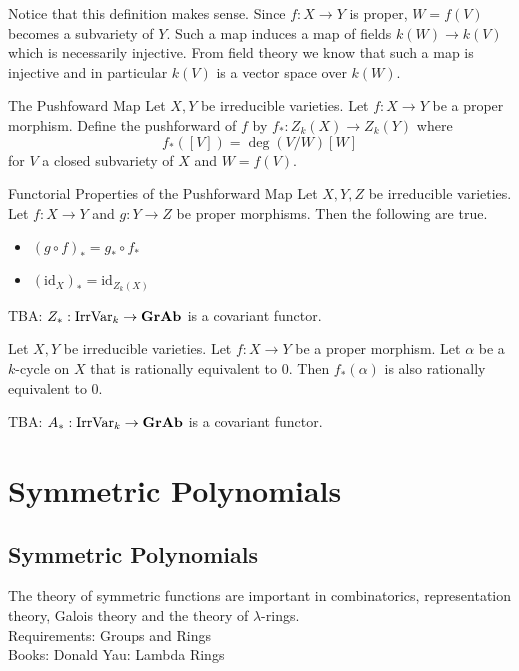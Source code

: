 \documentclass[a4paper]{article}
\begin{document}
Notice that this definition makes sense. Since $f:X\to Y$ is proper, $W=f(V)$ becomes a subvariety of $Y$. Such a map induces a map of fields $k(W)\to k(V)$ which is necessarily injective. From field theory we know that such a map is injective and in particular $k(V)$ is a vector space over $k(W)$. 

\begin{defn}{The Pushfoward Map}{} Let $X,Y$ be irreducible varieties. Let $f:X\to Y$ be a proper morphism. Define the pushforward of $f$ by $f_\ast:Z_k(X)\to Z_k(Y)$ where $$f_\ast([V])=\deg(V/W)[W]$$ for $V$ a closed subvariety of $X$ and $W=f(V)$. 
\end{defn}

\begin{lmm}{Functorial Properties of the Pushforward Map}{} Let $X,Y,Z$ be irreducible varieties. Let $f:X\to Y$ and $g:Y\to Z$ be proper morphisms. Then the following are true. 
\begin{itemize}
\item $(g\circ f)_\ast=g_\ast\circ f_\ast$
\item $(\text{id}_X)_\ast=\text{id}_{Z_k(X)}$
\end{itemize}
\end{lmm}

TBA: $Z_\ast:\text{IrrVar}_k\to\bold{GrAb}$ is a covariant functor. 

\begin{thm}{}{} Let $X,Y$ be irreducible varieties. Let $f:X\to Y$ be a proper morphism. Let $\alpha$ be a $k$-cycle on $X$ that is rationally equivalent to $0$. Then $f_\ast(\alpha)$ is also rationally equivalent to $0$. 
\end{thm}

TBA: $A_\ast:\text{IrrVar}_k\to\bold{GrAb}$ is a covariant functor. 

\pagebreak
\section{Symmetric Polynomials}
\subsection{Symmetric Polynomials}
The theory of symmetric functions are important in combinatorics, representation theory, Galois theory and the theory of $\lambda$-rings. \\

Requirements: Groups and Rings\\
Books: Donald Yau: Lambda Rings
\end{document}
